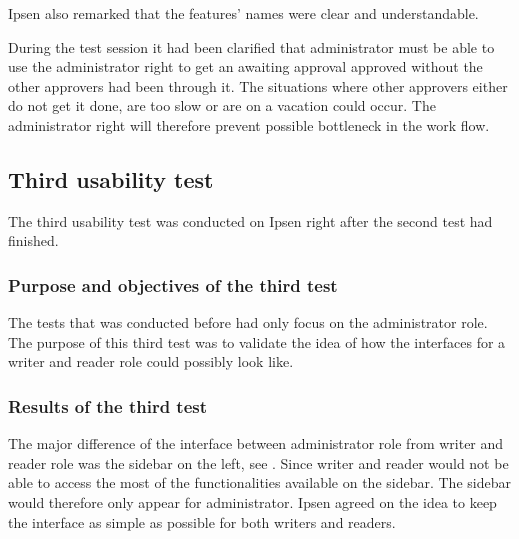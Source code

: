 Ipsen also remarked that the features' names were clear and understandable. 

During the test session it had been clarified that administrator must be able to use the administrator right to get an awaiting approval approved without the other approvers had been through it.
The situations where other approvers either do not get it done, are too slow or are on a vacation could occur. 
The administrator right will therefore prevent possible bottleneck in the work flow.



\subsection{Third usability test}\label{thirdtest}
The third usability test was conducted on Ipsen right after the second test had finished. 

\subsubsection*{Purpose and objectives of the third test}
The tests that was conducted before had only focus on the administrator role.
The purpose of this third test was to validate the idea of how the interfaces for a writer and reader role could possibly look like. 

\subsubsection*{Results of the third test}
The major difference of the interface between administrator role from writer and reader role was the sidebar on the left, see .
Since writer and reader would not be able to access the most of the functionalities available on the sidebar.
The sidebar would therefore only appear for administrator. 
Ipsen agreed on the idea to keep the interface as simple as possible for both writers and readers. 

